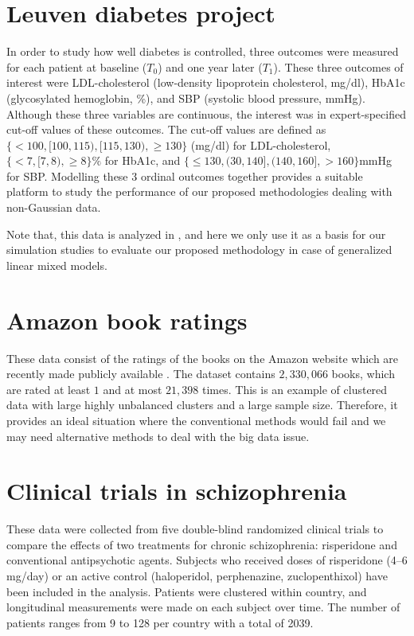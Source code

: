 \documentclass[11pt,a5paper,twoside]{book}
\begin{document}
\section{Leuven diabetes project} 

In order to study how well diabetes is controlled, three outcomes were measured for each patient at baseline ($T_0$) and one year later ($T_1$). These three outcomes of interest were LDL-cholesterol (low-density lipoprotein cholesterol, mg/dl), HbA1c (glycosylated hemoglobin, \%), and SBP (systolic blood pressure, mmHg). Although these three variables are continuous, the interest was in expert-specified cut-off values of these outcomes. The cut-off values are defined as $\{<100, [100,115), [115, 130),\geq 130 \}$ (mg/dl) for LDL-cholesterol, $\{<7, [7, 8), \geq 8\}\%$ for HbA1c, and $\{ \leq 130, (30,140],(140,160],>160\}$mmHg for SBP. Modelling these 3 ordinal outcomes together provides a suitable platform to study the performance of our proposed methodologies dealing with non-Gaussian data.

Note that, this data is analyzed in \cite{ivanova2017}, and here we only use it as a basis for our simulation studies to evaluate our proposed methodology in case of generalized linear mixed models. 

\section{Amazon book ratings} 
\label{mot_amazon}
These data consist of the ratings of the books on the Amazon website which are recently made publicly available \citep{amazon}. The dataset contains $2,330,066$ books, which are rated at least $1$ and at most $21,398$ times. This is an example of clustered data with large highly unbalanced clusters and a large sample size. Therefore, it provides an ideal situation where the conventional methods would fail and we may need alternative methods to deal with the big data issue.

\section{Clinical trials in schizophrenia} 

These data were collected from five double-blind randomized clinical trials to compare the effects of two treatments for chronic schizophrenia: risperidone and conventional antipsychotic agents. Subjects who received doses of risperidone (4–6 mg/day) or an active control (haloperidol, perphenazine, zuclopenthixol) have been included in the analysis. Patients were clustered within country, and longitudinal measurements were made on each subject over time. The number of patients ranges from 9 to 128 per country with a total of 2039. 
\end{document}
